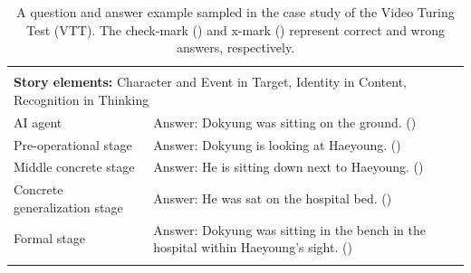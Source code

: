 \documentclass[letterpaper]{article} %
\newcommand{\cmark}{\ding{51}}
\newcommand{\xmark}{\ding{55}}
\begin{document}
\begin{table}[]
\centering
\begin{tabular}{ll}
\Xhline{2\arrayrulewidth}
\multicolumn{2}{l}{\textbf{Question:} What did Dokyung do in this scene?} \\
\multicolumn{2}{l}{\textbf{Story elements:} Character and Event in Target, Identity in Content, Recognition in Thinking} \\
\hline
AI agent & Answer: Dokyung was sitting on the ground. (\xmark)\\
Pre-operational stage & Answer: Dokyung is looking at Haeyoung. (\xmark)\\
Middle concrete stage & Answer: He is sitting down next to Haeyoung. (\cmark)\\
Concrete generalization stage & Answer: He was sat on the hospital bed. (\cmark)\\
Formal stage & Answer: Dokyung was sitting in the bench in the hospital within Haeyoung's sight. (\cmark)\\
\Xhline{2\arrayrulewidth}
\end{tabular}
\caption{A question and answer example sampled in the case study of the Video Turing Test (VTT). The check-mark (\cmark) and x-mark (\xmark) represent correct and wrong answers, respectively.}
\label{table:qual}
\end{table}
\end{document}
